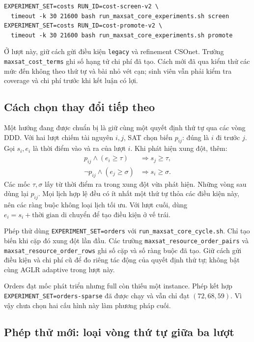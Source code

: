 \documentclass[11pt,a4paper]{article}
\newcommand{\code}[1]{\texttt{#1}}
\newcommand{\file}[1]{\nolinkurl{#1}}
\begin{document}
\begin{verbatim}
EXPERIMENT_SET=costs RUN_ID=cost-screen-v2 \
  timeout -k 30 21600 bash run_maxsat_core_experiments.sh screen
EXPERIMENT_SET=costs RUN_ID=cost-promote-v2 \
  timeout -k 30 21600 bash run_maxsat_core_experiments.sh promote
\end{verbatim}

Ở lượt này, giữ cách gửi điều kiện \code{legacy} và refinement CSOnet.
Trường \code{maxsat\_cost\_terms} ghi số hạng tử chi phí đã tạo. Cách mới đã
qua kiểm thử các mức đến không theo thứ tự và bài nhỏ vét cạn; sinh viên
vẫn phải kiểm tra coverage và chi phí trước khi kết luận có lợi.

\subsection{Cách chọn thay đổi tiếp theo}

Một hướng đang được chuẩn bị là giữ cùng một quyết định thứ tự qua các vòng
DDD. Với hai lượt chiếm tài nguyên $i,j$, SAT chọn biến $p_{ij}$: đúng là
$i$ đi trước $j$. Gọi $s_i,e_i$ là thời điểm vào và ra của lượt $i$.
Khi phát hiện xung đột, thêm:
\[
\begin{aligned}
p_{ij}\land(e_i\ge\tau)&\Rightarrow s_j\ge\tau,\\
\neg p_{ij}\land(e_j\ge\sigma)&\Rightarrow s_i\ge\sigma.
\end{aligned}
\]
Các mốc $\tau,\sigma$ lấy từ thời điểm ra trong xung đột vừa phát hiện.
Những vòng sau dùng lại $p_{ij}$. Mọi lịch hợp lệ đều có ít nhất một thứ tự
thỏa các điều kiện này, nên các ràng buộc không loại lịch tối ưu. Với lượt
cuối, dùng $e_i=s_i+\text{thời gian di chuyển}$ để tạo điều kiện ở vế trái.

Phép thử dùng \code{EXPERIMENT\_SET=orders} với
\file{run_maxsat_core_cycle.sh}. Chỉ tạo biến khi cặp đó xung đột lần đầu.
Các trường \code{maxsat\_resource\_order\_pairs} và
\code{maxsat\_resource\_order\_rows} ghi số cặp và số ràng buộc đã tạo.
Giữ cách gửi điều kiện và chi phí cũ để đo riêng tác động của quyết định
thứ tự; không bật cùng AGLR adaptive trong lượt này.

Orders đạt mốc phát triển nhưng full còn thiếu một instance. Phép kết hợp
\code{EXPERIMENT\_SET=orders-sparse} đã được chạy và vẫn chỉ đạt
$(72,68,59)$. Vì vậy chưa chọn hai cấu hình này làm phương pháp cuối.

\subsection{Phép thử mới: loại vòng thứ tự giữa ba lượt}
\end{document}
